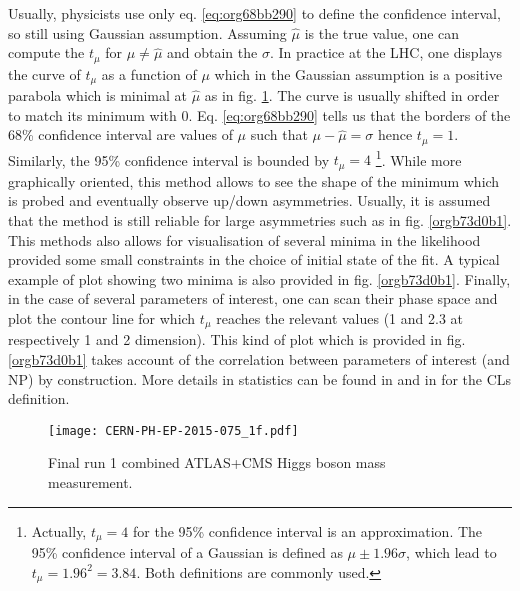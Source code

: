 Usually, physicists use only eq. \ref{eq:org68bb290} to define the confidence interval, so still using Gaussian assumption.
Assuming \(\hat{\mu}\) is the true value, one can compute the $t_\mu$ for \(\mu \neq \hat{\mu}\) and obtain the \(\sigma\).
In practice at the LHC, one displays the curve of $t_\mu$ as a function of \(\mu\) which in the Gaussian assumption is a positive parabola which is minimal at \(\hat{\mu}\) as in fig. \ref{fig:org31eaacd}.
The curve is usually shifted in order to match its minimum with 0.
Eq. \ref{eq:org68bb290} tells us that the borders of the 68\% confidence interval are values of \(\mu\) such that \(\mu-\hat{\mu}=\sigma\) hence $t_\mu=1$.
Similarly, the 95\% confidence interval is bounded by $t_\mu=4$
\footnote{Actually, $t_\mu=4$ for the 95\% confidence interval is an approximation.
  The 95\% confidence interval of a Gaussian is defined as $\mu\pm1.96\sigma$, which lead to $t_\mu=1.96^2=3.84$.
Both definitions are commonly used.}.
While more graphically oriented, this method allows to see the shape of the minimum which is probed and eventually observe up/down asymmetries.
Usually, it is assumed that the method is still reliable for large asymmetries such as in fig. \ref{orgb73d0b1}.
This methods also allows for visualisation of several minima in the likelihood provided some small constraints in the choice of initial state of the fit.
A typical example of plot showing two minima is also provided in fig. \ref{orgb73d0b1}.
Finally, in the case of several parameters of interest, one can scan their phase space and plot the contour line for which $t_\mu$ reaches the relevant values (1 and 2.3 at respectively 1 and 2 dimension).
This kind of plot which is provided in fig. \ref{orgb73d0b1} takes account of the correlation between parameters of interest (and NP) by construction.
More details in statistics can be found in \cite{Cowan1998,CERN-THESIS-2012-144,CERN-THESIS-2015-193} and in \cite{Read:722145} for the CLs definition.

\begin{figure}[htbp]
\centering
\texttt{[image: CERN-PH-EP-2015-075\_1f.pdf]}
\caption{\label{fig:org31eaacd}
Final run 1 combined ATLAS+CMS Higgs boson mass measurement.\cite{CERN-PH-EP-2015-075}}
\end{figure}


